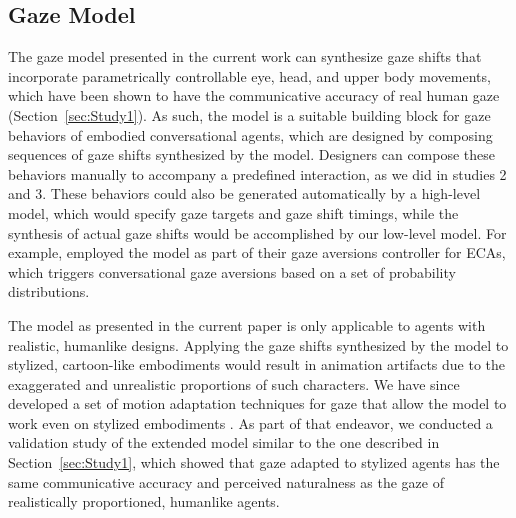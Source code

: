 \subsection{Gaze Model}

The gaze model presented in the current work can synthesize gaze shifts that incorporate parametrically controllable eye, head, and upper body movements, which have been shown to have the communicative accuracy of real human gaze (Section~\ref{sec:Study1}). As such, the model is a suitable building block for gaze behaviors of embodied conversational agents, which are designed by composing sequences of gaze shifts synthesized by the model. Designers can compose these behaviors manually to accompany a predefined interaction, as we did in studies 2 and 3. These behaviors could also be generated automatically by a high-level model, which would specify gaze targets and gaze shift timings, while the synthesis of actual gaze shifts would be accomplished by our low-level model. For example, \citet{andrist2013aversion} employed the model as part of their gaze aversions controller for ECAs, which triggers conversational gaze aversions based on a set of probability distributions.

The model as presented in the current paper is only applicable to agents with realistic, humanlike designs. Applying the gaze shifts synthesized by the model to stylized, cartoon-like embodiments would result in animation artifacts due to the exaggerated and unrealistic proportions of such characters. We have since developed a set of motion adaptation techniques for gaze that allow the model to work even on stylized embodiments \cite{pejsa2013stylized}. As part of that endeavor, we conducted a validation study of the extended model similar to the one described in Section~\ref{sec:Study1}, which showed that gaze adapted to stylized agents has the same communicative accuracy and perceived naturalness as the gaze of realistically proportioned, humanlike agents.

